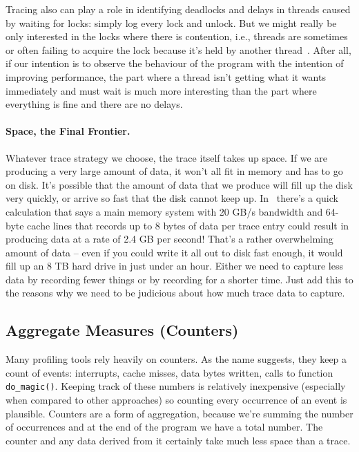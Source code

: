 Tracing also can play a role in identifying deadlocks and delays in threads caused by waiting for locks: simply log every lock and unlock. But we might really be only interested in the locks where there is contention, i.e., threads are sometimes or often failing to acquire the lock because it's held by another thread~\cite{usd}. After all, if our intention is to observe the behaviour of the program with the intention of improving performance, the part where a thread isn't getting what it wants immediately and must wait is much more interesting than the part where everything is fine and there are no delays.

\paragraph{Space, the Final Frontier.} Whatever trace strategy we choose, the trace itself takes up space. If we are producing a very large amount of data, it won't all fit in memory and has to go on disk. It's possible that the amount of data that we produce will fill up the disk very quickly, or arrive so fast that the disk cannot keep up. In~\cite{usd} there's a quick calculation that says a main memory system with 20 GB/s bandwidth and 64-byte cache lines that records up to 8 bytes of data per trace entry could result in producing data at a rate of 2.4 GB per second! That's a rather overwhelming amount of data -- even if you could write it all out to disk fast enough, it would fill up an 8 TB hard drive in just under an hour. Either we need to capture less data by recording fewer things or by recording for a shorter time. Just add this to the reasons why we need to be judicious about how much trace data to capture.

\subsection*{Aggregate Measures (Counters)}
Many profiling tools rely heavily on counters. As the name suggests, they keep a count of events: interrupts, cache misses, data bytes written, calls to function \texttt{do\_magic()}. Keeping track of these numbers is relatively inexpensive (especially when compared to other approaches) so counting every occurrence of an event is plausible. Counters are a form of aggregation, because we're summing the number of occurrences and at the end of the program we have a total number. The counter and any data derived from it certainly take much less space than a trace.

